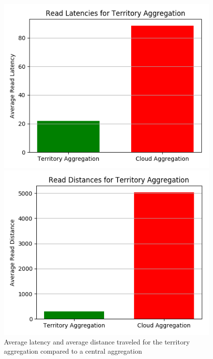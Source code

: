 \begin{figure}[H]
\begin{minipage}{0.49\textwidth}
\centering
\includegraphics[width=1\linewidth]{Figures/Evaluation/read-by-latency-Territory-Aggregation.png}
\end{minipage}
\hfill
\begin{minipage}{0.49\textwidth}
\centering
\includegraphics[width=1\linewidth]{Figures/Evaluation/read-by-distance-Territory-Aggregation.png}
\end{minipage}
\label{fig:read-by-territory}
\caption{Average latency and average distance traveled for the territory aggregation compared to a central aggregation}
\end{figure}


